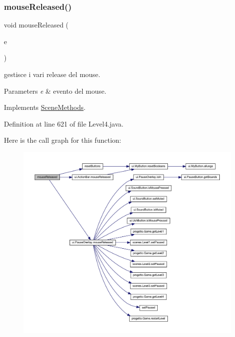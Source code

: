 \subsubsection{\texorpdfstring{mouse\+Released()}{mouseReleased()}}
{\footnotesize\ttfamily void mouse\+Released (\begin{DoxyParamCaption}\item[{Mouse\+Event}]{e }\end{DoxyParamCaption})}



gestisce i vari release del mouse. 


\begin{DoxyParams}{Parameters}
{\em e} & evento del mouse. \\
\hline
\end{DoxyParams}


Implements \hyperlink{interfacescenes_1_1_scene_methods_a87a07291794e15052db67f945d90853e}{Scene\+Methods}.



Definition at line 621 of file Level4.\+java.

Here is the call graph for this function\+:\nopagebreak
\begin{figure}[H]
\begin{center}
\leavevmode
\includegraphics[width=350pt]{classscenes_1_1_level4_a87a07291794e15052db67f945d90853e_cgraph}
\end{center}
\end{figure}
\mbox{\label{classscenes_1_1_level4_addba85b44e35a186e066b2e801f433c4}} 
